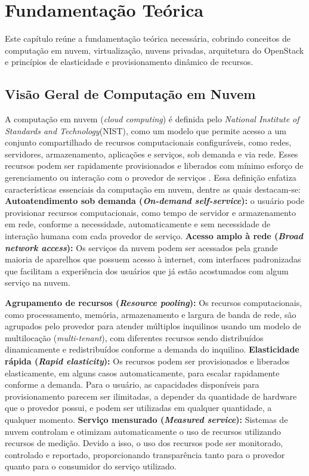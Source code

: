 \chapter{Fundamentação Teórica}

Este capítulo reúne a fundamentação teórica necessária, cobrindo conceitos de computação em nuvem, virtualização, nuvens privadas, arquitetura do OpenStack e princípios de elasticidade e provisionamento dinâmico de recursos.

\section{Visão Geral de Computação em Nuvem}

A computação em nuvem (\textit{cloud computing}) é definida pelo \textit{National Institute of Standards and Technology}(NIST), como um modelo que permite acesso a um conjunto compartilhado de recursos computacionais configuráveis, como redes, servidores, armazenamento, aplicações e serviços,  sob demanda e via rede. Esses recursos podem ser rapidamente provisionados e liberados com mínimo esforço de gerenciamento ou interação com o provedor de serviços \cite{mell2011}. Essa definição enfatiza características essenciais da computação em nuvem, dentre as quais destacam-se: 
\textbf{Autoatendimento sob demanda (\textit{On-demand self-service}):} o usuário pode provisionar recursos computacionais, como tempo de servidor e armazenamento em rede, conforme a necessidade, automaticamente e sem necessidade de interação humana com cada provedor de serviço.
\textbf{Acesso amplo à rede (\textit{Broad network access}):} Os serviços da nuvem podem ser acessados pela grande maioria de aparelhos que possuem acesso à internet, com interfaces padronizadas que facilitam a experiência dos usuários que já estão acostumados com algum serviço na nuvem.
 
\textbf{Agrupamento de recursos (\textit{Resource pooling}):} Os recursos computacionais, como processamento, memória, armazenamento e largura de banda de rede, são agrupados pelo provedor para atender múltiplos inquilinos usando um modelo de multilocação (\textit{multi-tenant}), com diferentes recursos sendo distribuídos dinamicamente e redistribuídos conforme a demanda do inquilino.
\textbf{Elasticidade rápida (\textit{Rapid elasticity}):} Os recursos podem ser provisionados e liberados elasticamente, em alguns casos automaticamente, para escalar rapidamente conforme a demanda. Para o usuário, as capacidades disponíveis para provisionamento parecem ser ilimitadas, a depender da quantidade de hardware que o provedor possui,  e podem ser utilizadas em qualquer quantidade, a qualquer momento. 
\textbf{Serviço mensurado (\textit{Measured service}):} Sistemas de nuvem controlam e otimizam automaticamente o uso de recursos utilizando recursos de medição. Devido a isso, o uso dos recursos pode ser monitorado, controlado e reportado, proporcionando transparência tanto para o provedor quanto para o consumidor do serviço utilizado. 

